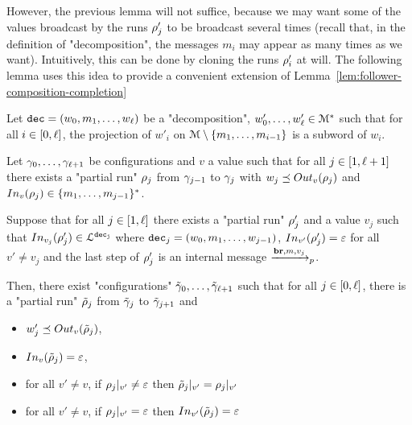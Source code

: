 However, the previous lemma will not suffice, because we may want some of the values broadcast by the runs $\run_j'$ to be broadcast several times (recall that, in the definition of "decomposition", the messages $m_i$ may appear as many times as we want). Intuitively, this can be done by cloning the runs $\run_i'$ at will. The following lemma uses this idea to provide a convenient extension of Lemma~\ref{lem:follower-composition-completion} 

\begin{lemma}
	\label{lem:follower-composition-output}
	Let $\decsymb = (w_0, m_1, \ldots, w_\ell)$ be a "decomposition", $w'_0, \ldots, w'_\ell \in \messages^*$ such that for all $i \in \nset{0}{\ell}$, the projection of $w'_i$ on $\messages\setminus \set{m_1, \ldots, m_{i-1}}$ is a subword of $w_i$.
	
	Let $\config_0, \ldots, \config_{\ell+1}$ be configurations and $v$ a value such that for all $j \in\nset{1}{\ell+1}$ there exists a "partial run" $\run_j$ from $\config_{j-1}$ to $\config_{j}$ with $w_j \subword \voutput{v}{\run_j}$ and $\vinput{v}{\run_j} \in \set{m_1,\ldots, m_{j-1}}^*$.
	
	Suppose that for all $j \in\nset{1}{\ell}$ there exists a "partial run" $\run'_j$ and a value $v_j$ such that $\vinput{v_j}{\run'_j} \in \langdec{\decsymb_j}$ where $\decsymb_j = (w_0, m_1, \ldots, w_{j-1})$, $\vinput{v'}{\run'_j} = \varepsilon$ for all $v' \neq v_j$ and the last step of $\run'_j$ is an internal message $\intmessage{m}{v_j}$.
	
	Then, there exist "configurations" $\Tilde{\config}_0, \ldots, \Tilde{\config}_{\ell+1}$ such that for all $j \in\nset{0}{\ell}$, there is a "partial run" $\Tilde{\run}_j$ from $\Tilde{\config}_j$ to $\Tilde{\config}_{j+1}$ and
\begin{itemize}
	\item $w'_j \subword \voutput{v}{\Tilde{\run}_j}$, 
	
	\item $\vinput{v}{\Tilde{\run}_j} = \varepsilon$,
	
	\item for all $v' \neq v$, if $\vproj{v'}{\run_j} \neq \varepsilon$ then $\vproj{v'}{\Tilde{\run}_j} = \vproj{v'}{\run_j}$
	
	\item for all $v' \neq v$, if $\vproj{v'}{\run_j} = \varepsilon$ then $\vinput{v'}{\Tilde{\run}_j} = \varepsilon$
\end{itemize}
\end{lemma}

